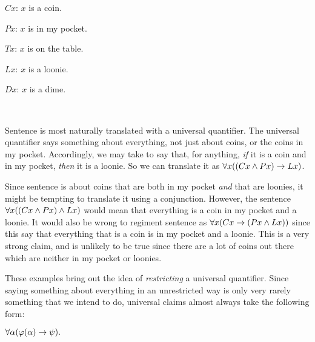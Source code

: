 \begin{earg} \label{loonie}
\end{earg}


\begin{ekey}
  \begin{multicols}{2}
    \item[$Cx$:] $x$ is a coin.
    \item[$Px$:] $x$ is in my pocket.
    \item[$Tx$:] $x$ is on the table.
    \item[$Lx$:] $x$ is a loonie.
    \item[$Dx$:] $x$ is a dime.
    \item[] ~
  \end{multicols}
\end{ekey}

Sentence  is most naturally translated with a universal quantifier.
The universal quantifier says something about everything, not just about coins, or the coins in my pocket.
Accordingly, we may take  to say that, for anything, \textit{if} it is a coin and in my pocket, \textit{then} it is a loonie.
So we can translate it as $\forall x((Cx \wedge Px) \rightarrow Lx)$.

Since sentence  is about coins that are both in my pocket \emph{and} that are loonies, it might be tempting to translate it using a conjunction.
However, the sentence $\forall x((Cx \wedge Px) \wedge Lx)$ would mean that everything is a coin in my pocket and a loonie.
It would also be wrong to regiment sentence  as $\forall x(Cx \rightarrow (Px \wedge Lx))$ since this say that everything that is a coin is in my pocket and a loonie. 
This is a very strong claim, and is unlikely to be true since there are a lot of coins out there which are neither in my pocket or loonies.

These examples bring out the idea of \textit{restricting} a universal quantifier.
Since saying something about everything in an unrestricted way is only very rarely something that we intend to do, universal claims almost always take the following form:

\begin{earg} \label{restrict}
\item $\forall\alpha(\varphi(\alpha) \rightarrow \psi).$ 
\end{earg}

